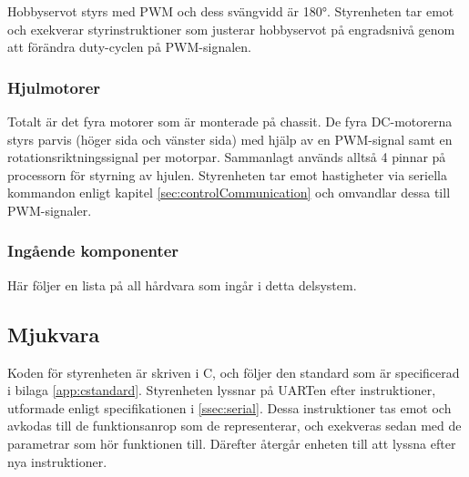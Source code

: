 \documentclass[a4paper,11pt]{article}
\begin{document}
Hobbyservot styrs med PWM och dess svängvidd är 180\si{\degree}. Styrenheten tar emot och exekverar styrinstruktioner som justerar hobbyservot på engradsnivå genom att förändra duty-cyclen på PWM-signalen.

\subsubsection{Hjulmotorer}
Totalt är det fyra motorer som är monterade på chassit. De fyra DC-motorerna styrs parvis (höger sida och vänster sida) med hjälp av en PWM-signal samt en rotationsriktningssignal per motorpar. Sammanlagt används alltså 4 pinnar på processorn för styrning av hjulen. Styrenheten tar emot hastigheter via seriella kommandon enligt kapitel \ref{sec:controlCommunication} och omvandlar dessa till PWM-signaler.

\subsubsection{Ingående komponenter}
Här följer en lista på all hårdvara som ingår i detta delsystem.

\begin{HardwareList}
\end{HardwareList}

\subsection{Mjukvara}
Koden för styrenheten är skriven i C, och följer den standard som är specificerad i bilaga \ref{app:cstandard}. 
Styrenheten lyssnar på UARTen efter instruktioner, utformade enligt specifikationen i \ref{ssec:serial}. Dessa instruktioner tas emot och avkodas till de funktionsanrop som de representerar, och exekveras sedan med de parametrar som hör funktionen till. Därefter återgår enheten till att lyssna efter nya instruktioner.


\end{document}
